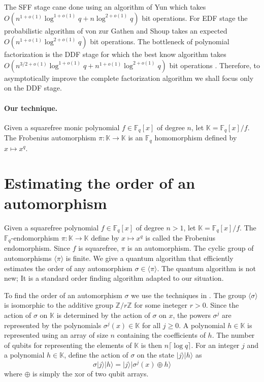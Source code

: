 \documentclass{article}
\theoremstyle{plain}
\theoremstyle{definition}
\newcommand{\lrang}[1]{\langle#1\rangle}
\newcommand{\ldbrac}[1]{\lvert#1\rangle}
\def\K{\ensuremath{\mathbb{K}}}
\def\Z{\ensuremath{\mathbb{Z}}}
\def\F{\ensuremath{\mathbb{F}}}
\begin{document}
The SFF stage cane done using an algorithm of Yun \cite{yun1976square} which takes $O(n^{1 + 
o(1)}\log^{1 + o(1)}q + n\log^{2 + o(1)}q)$ bit operations. For EDF stage the probabilistic 
algorithm of von zur Gathen and Shoup \cite{von1992computing} takes an expected $O(n^{1 + 
o(1)}\log^{2 + o(1)}q)$ bit operations. The bottleneck of polynomial factorization is the DDF 
stage for which the best know algorithm takes $O(n^{3/2 + o(1)}\log^{1 + o(1)}q + n^{1 + o(1)} 
\log^{2 + o(1)}q)$ bit operations \cite{kedlaya2011fast}. Therefore, to asymptotically improve the 
complete factorization algorithm we shall focus only on the DDF stage.

\paragraph{Our technique.}
Given a squarefree monic polynomial $f \in \F_q[x]$ of degree $n$, let $\K = \F_q[x] / f$. The 
Frobenius automorphism $\pi: \K \rightarrow \K$ is an $\F_q$ homomorphism defined by $x \mapsto 
x^q$.  





\section{Estimating the order of an automorphism}
\label{sec:ord-frob}

Given a squarefree polynomial $f \in \F_q[x]$ of degree $n > 1$, let $\K = \F_q[x] / f$. The 
$\F_q$-endomorphism $\pi: \K \rightarrow \K$ define by $x \mapsto x^q$ is called the Frobenius 
endomorphism. Since $f$ is squarefree, $\pi$ is an automorphism. The cyclic group of automorphisms 
$\lrang{\pi}$ is finite. We give a quantum algorithm that efficiently estimates the order of any 
automorphism $\sigma \in \lrang{\pi}$. The quantum algorithm is not new; It is a standard order 
finding algorithm adapted to our situation. 

To find the order of an automorphism $\sigma$ we use the techniques in \cite{kaye2007introduction, 
nielsen2010quantum}. The group $\lrang{\sigma}$ is isomorphic to the additive group $\Z/r\Z$ for 
some ineteger $r > 0$. Since the action of $\sigma$ on $\K$ is determined by the action of $\sigma$ 
on $x$, the powers $\sigma^j$ are represented by the polynomials $\sigma^j(x) \in \K$ for all $j 
\ge 0$. A polynomial $h \in \K$ is represented using an array of size $n$ containing the 
coefficients of $h$. The number of qubits for representing the elements of $\K$ is then $n\lceil 
\log q \rceil$. For an integer $j$ and a polynomial $h \in \K$, define the action of $\sigma$ on the 
state $\ldbrac{j} \ldbrac{h}$ as
\begin{equation}
	\label{equ:sig-act}
	\sigma \ldbrac{j}\ldbrac{h} = \ldbrac{j}\ldbrac{\sigma^j(x) \oplus h}
\end{equation}
where $\oplus$ is simply the xor of two qubit arrays.
\end{document}
